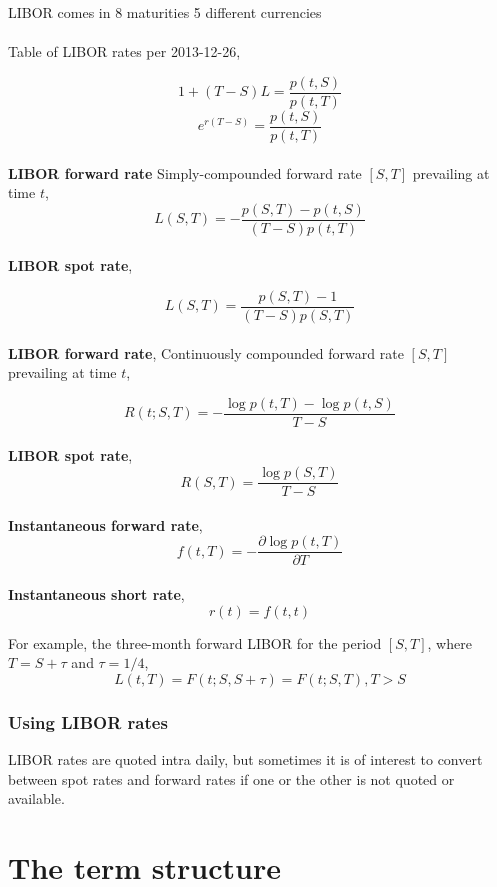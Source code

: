 \documentclass[11pt,a4paper]{article}
\numberwithin{equation}{section}
\begin{document}
	LIBOR comes in 8 maturities
	5 different currencies
	\\
	\\
	Table of LIBOR rates per 2013-12-26,




	\[ 
	1+(T-S)L=\frac{p(t,S)}{p(t,T)}
	\]
	\[ 
	e^{r(T-S)}=\frac{p(t,S)}{p(t,T)}
	\]
	\\
	\textbf{LIBOR forward rate}
	Simply-compounded forward rate $[S,T]$ prevailing at time $t$,
	\[
	L(S,T) = -\frac{p(S,T)-p(t,S)}{(T-S)p(t,T)}
	\]
	\\
	\textbf{LIBOR spot rate},

	\[
	L(S,T)=\frac{p(S,T)-1}{(T-S)p(S,T)}
	\]
	\\
	\textbf{LIBOR forward rate},
	Continuously compounded forward rate $[S,T]$ prevailing at time $t$,

	\[
	R(t;S,T)=-\frac{\log{p(t,T)}-\log{p(t,S)}}{T-S}
	\]
	\\
	\textbf{LIBOR spot rate},
	\[
	R(S,T)=\frac{\log{p(S,T)}}{T-S}
	\]
	\\
	\textbf{Instantaneous forward rate},
	\[
	f(t,T)=-\frac{\partial\log{p(t,T)}}{\partial{T}}
	\]
	\\
	\textbf{Instantaneous short rate},
	\[
	r(t)=f(t,t)
	\]

	For example, the three-month forward LIBOR for the period $[S,T]$, where $T=S+\tau$ and $\tau=1/4$,
	\[
	L(t,T) = F(t;S,S+\tau) = F(t;S,T), T>S
	\]

	\subsubsection{Using LIBOR rates}
	LIBOR rates are quoted intra daily, but sometimes it is of interest to convert between spot rates and forward rates if one or the
	other is not quoted or available.


	\section{The term structure}
\end{document}
